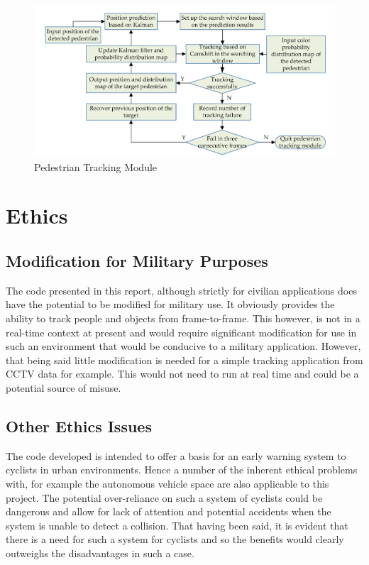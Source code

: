 \documentclass[a4paper,11pt,notitlepage]{article}
\begin{document}
\noindent \begin{figure}[h!]
\includegraphics[width = 1.0\hsize]{figures/pedestrian_tracking_module.png}
\caption{Pedestrian Tracking Module \cite{Ped_tract} }
\label{Ped_tr_mod_fig}
\end{figure}

\newpage

\section{Ethics}

\subsection{Modification for Military Purposes}
The code presented in this report, although strictly for civilian applications does have the potential to be modified for military use. It obviously provides the ability to track people and objects from frame-to-frame. This however, is not in a real-time context at present and would require significant modification for use in such an environment that would be conducive to a military application. However, that being said little modification is needed for a simple tracking application from CCTV data for example. This would not need to run at real time and could be a potential source of misuse.

\subsection{Other Ethics Issues}

The code developed is intended to offer a basis for an early warning system to cyclists in urban environments. Hence a number of the inherent ethical problems with, for example the autonomous vehicle space are also applicable to this project. The potential over-reliance on such a system of cyclists could be dangerous and allow for lack of attention and potential accidents when the system is unable to detect a collision. That having been said, it is evident that there is a need for such a system for cyclists and so the benefits would clearly outweighs the disadvantages in such a case.
\end{document}
